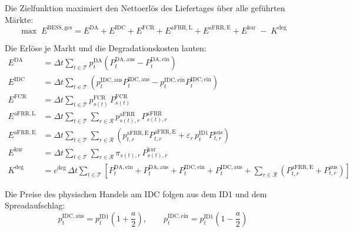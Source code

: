 Die Zielfunktion maximiert den Nettoerlös des Liefertages über alle geführten Märkte:
\begin{equation}
    \label{eq:anh:modell:ziel}
    \max \; E^{\mathrm{BESS,ges}} = E^{\mathrm{DA}} + E^{\mathrm{IDC}} + E^{\mathrm{FCR}} + E^{\mathrm{aFRR,L}} + E^{\mathrm{aFRR,E}} + E^{\mathrm{kur}} \; - \; K^{\mathrm{deg}}
\end{equation}

Die Erlöse je Markt und die Degradationskosten lauten:
\begin{align}
    E^{\mathrm{DA}} &= \Delta t \sum_{t \in \mathcal{T}} p^{\mathrm{DA}}_t \left( P^{\mathrm{DA,aus}}_t - P^{\mathrm{DA,ein}}_t \right) \label{eq:anh:modell:e_da}\\
    E^{\mathrm{IDC}} &= \Delta t \sum_{t \in \mathcal{T}} \left( p^{\mathrm{IDC,aus}}_t P^{\mathrm{IDC,aus}}_t - p^{\mathrm{IDC,ein}}_t P^{\mathrm{IDC,ein}}_t \right) \label{eq:anh:modell:e_idc}\\
    E^{\mathrm{FCR}} &= \Delta t \sum_{t \in \mathcal{T}} p^{\mathrm{FCR}}_{s(t)} \, P^{\mathrm{FCR}}_{s(t)} \label{eq:anh:modell:e_fcr}\\
    E^{\mathrm{aFRR,L}} &= \Delta t \sum_{t \in \mathcal{T}} \sum_{r \in \mathcal{R}} p^{\mathrm{aFRR}}_{s(t),r} \, P^{\mathrm{aFRR}}_{s(t),r} \label{eq:anh:modell:e_afrr_l}\\
    E^{\mathrm{aFRR,E}} &= \Delta t \sum_{t \in \mathcal{T}} \sum_{r \in \mathcal{R}} \left( p^{\mathrm{aFRR,E}}_{t,r} P^{\mathrm{aFRR,E}}_{t,r} + \varepsilon_r \, p^{\mathrm{ID1}}_t P^{\mathrm{aus}}_{t,r} \right) \label{eq:anh:modell:e_afrr_e}\\
    E^{\mathrm{kur}} &= \Delta t \sum_{t \in \mathcal{T}} \sum_{r \in \mathcal{R}} \pi_{s(t),r} \, P^{\mathrm{kur}}_{s(t),r} \label{eq:anh:modell:e_kur}\\
    K^{\mathrm{deg}} &= c^{\mathrm{deg}} \, \Delta t \sum_{t \in \mathcal{T}} \left[ P^{\mathrm{DA,ein}}_t + P^{\mathrm{DA,aus}}_t + P^{\mathrm{IDC,ein}}_t + P^{\mathrm{IDC,aus}}_t + \sum_{r \in \mathcal{R}} \left( P^{\mathrm{aFRR,E}}_{t,r} + P^{\mathrm{aus}}_{t,r} \right) \right] \label{eq:anh:modell:k_deg}
\end{align}

Die Preise des physischen Handels am \acs{IDC} folgen aus dem \acs{ID1} und dem Spreadaufschlag:
\begin{equation}
    \label{eq:anh:modell:idc_preise}
    p^{\mathrm{IDC,aus}}_t = p^{\mathrm{ID1}}_t \left( 1 + \frac{a}{2} \right), \qquad p^{\mathrm{IDC,ein}}_t = p^{\mathrm{ID1}}_t \left( 1 - \frac{a}{2} \right)
\end{equation}

